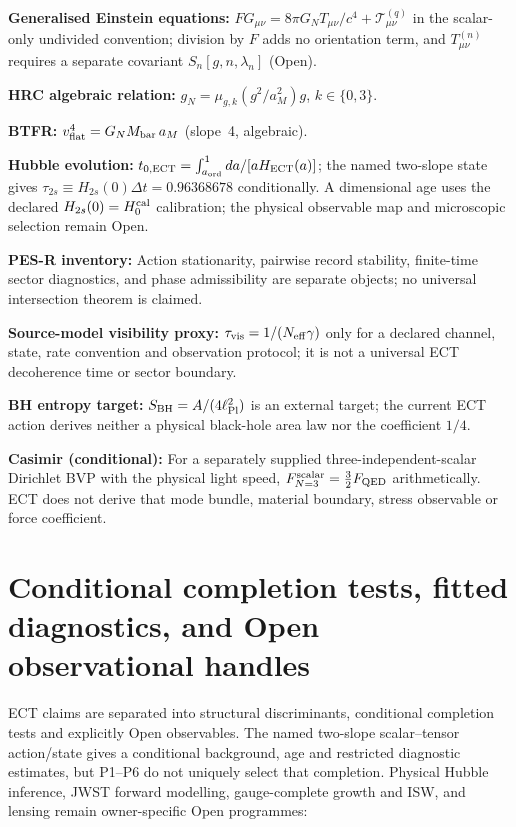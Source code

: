 \documentclass[11pt,a4paper]{article}
\begin{document}
\textbf{Generalised Einstein equations:}
$F G_{\mu\nu}=8\pi G_N T_{\mu\nu}/c^4+\mathcal T^{(q)}_{\mu\nu}$ in the scalar-only undivided convention; division by $F$ adds no orientation term, and $T^{(n)}_{\mu\nu}$ requires a separate covariant $S_n[g,n,\lambda_n]$ (Open).

\textbf{HRC algebraic relation:}
$g_N=\mu_{g,k}(g^2/a_M^2)g$, $k\in\{0,3\}$.

\textbf{BTFR:}
$v_{\rm flat}^4 = G_N M_{\rm bar}\,a_M$ (slope~4, algebraic).

\textbf{Hubble evolution:}
$t_{0,\rm ECT}=\int_{a_{\rm ord}}^1 da/[aH_{\rm ECT}(a)]$; the named two-slope state gives $\tau_{2s}\equiv H_{2s}(0)\Delta t=0.96368678$ conditionally. A dimensional age uses the declared $H_{2s}(0)=H_0^{\rm cal}$ calibration; the physical observable map and microscopic selection remain Open.

\textbf{PES-R inventory:}
Action stationarity, pairwise record stability, finite-time sector diagnostics, and phase admissibility are separate objects; no universal intersection theorem is claimed.

\textbf{Source-model visibility proxy:}
$\tau_{\rm vis}=1/(N_{\rm eff}\gamma)$ only for a declared channel, state,
rate convention and observation protocol; it is not a universal ECT
decoherence time or sector boundary.

\textbf{BH entropy target:}
$S_{\rm BH}=A/(4\ell_{\rm Pl}^2)$ is an external target; the current ECT action derives neither a physical black-hole area law nor the coefficient $1/4$.

\textbf{Casimir (conditional):}
For a separately supplied three-independent-scalar Dirichlet BVP with
the physical light speed, $F_{N=3}^{\rm scalar}=\tfrac32F_{\rm QED}$
arithmetically.  ECT does not derive that mode bundle, material boundary,
stress observable or force coefficient.


\section{Conditional completion tests, fitted diagnostics, and Open observational handles}
\label{sec:pop_predictions}

ECT claims are separated into structural discriminants, conditional
completion tests and explicitly Open observables.  The named two-slope
scalar--tensor action/state gives a conditional background, age and
restricted diagnostic estimates, but P1--P6 do not uniquely select that
completion.  Physical Hubble inference, JWST forward modelling,
gauge-complete growth and ISW, and lensing remain owner-specific Open
programmes:
\end{document}
